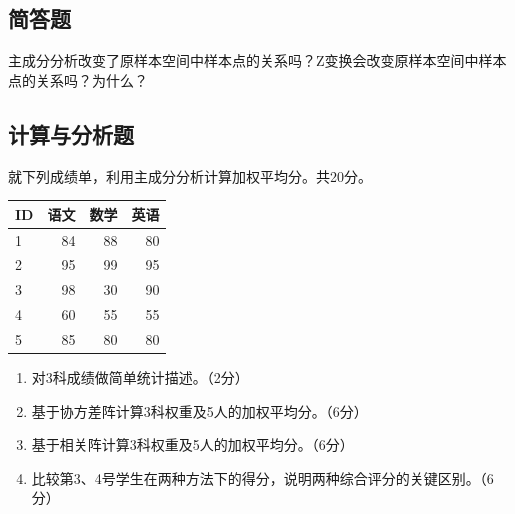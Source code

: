 \par\addvspace{6pt}\noindent\begin{minipage}{\linewidth}

\subsection{简答题}


主成分分析改变了原样本空间中样本点的关系吗？Z变换会改变原样本空间中样本点的关系吗？为什么？



\end{minipage}\par\vspace{4pt}

\par\addvspace{6pt}\noindent\begin{minipage}{\linewidth}

\subsection{计算与分析题}


就下列成绩单，利用主成分分析计算加权平均分。共20分。

\begin{center}\small\setlength{\tabcolsep}{4pt}\renewcommand{\arraystretch}{1.18}\begin{tabular}{@{}lrrr@{}}
\toprule
ID & 语文 & 数学 & 英语 \\
\midrule

1 & 84 & 88 & 80 \\
2 & 95 & 99 & 95 \\
3 & 98 & 30 & 90 \\
4 & 60 & 55 & 55 \\
5 & 85 & 80 & 80 \\
\bottomrule\end{tabular}\end{center}

\begin{enumerate}
\def\labelenumi{\arabic{enumi}.}
\tightlist
\item
  对3科成绩做简单统计描述。（2分）
\item
  基于协方差阵计算3科权重及5人的加权平均分。（6分）
\item
  基于相关阵计算3科权重及5人的加权平均分。（6分）
\item
  比较第3、4号学生在两种方法下的得分，说明两种综合评分的关键区别。（6分）
\end{enumerate}



\end{minipage}\par\vspace{4pt}

